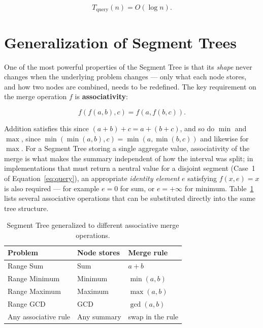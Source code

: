 \documentclass[11pt]{scrartcl}
\begin{document}
\begin{equation}
\boxed{T_{\text{query}}(n) = O(\log n)}.
\end{equation}

\section{Generalization of Segment Trees}
\label{sec:generalization}

One of the most powerful properties of the Segment Tree is that its \emph{shape} never changes when the underlying problem changes --- only what each node stores, and how two nodes are combined, needs to be redefined. The key requirement on the merge operation $f$ is \textbf{associativity}:

\begin{equation}
f(f(a,b),c) = f(a,f(b,c)).
\end{equation}

Addition satisfies this since $(a+b)+c = a+(b+c)$, and so do $\min$ and $\max$, since $\min(\min(a,b),c) = \min(a,\min(b,c))$ and likewise for $\max$. For a Segment Tree storing a single aggregate value, associativity of the merge is what makes the summary independent of how the interval was split; in implementations that must return a neutral value for a disjoint segment (Case~1 of Equation~\eqref{eq:query}), an appropriate \emph{identity element} $e$ satisfying $f(x,e) = x$ is also required --- for example $e = 0$ for sum, or $e = +\infty$ for minimum. Table~\ref{tab:generalization} lists several associative operations that can be substituted directly into the same tree structure.

\begin{table}[h]
\centering
\caption{Segment Tree generalized to different associative merge operations.}
\label{tab:generalization}
\begin{tabular}{lll}
\toprule
\textbf{Problem} & \textbf{Node stores} & \textbf{Merge rule} \\
\midrule
Range Sum     & Sum         & $a+b$ \\
Range Minimum & Minimum     & $\min(a,b)$ \\
Range Maximum & Maximum     & $\max(a,b)$ \\
Range GCD     & GCD         & $\gcd(a,b)$ \\
\rowcolor{lightblue!30}
Any associative rule & Any summary & swap in the rule \\
\bottomrule
\end{tabular}
\end{table}
\end{document}
